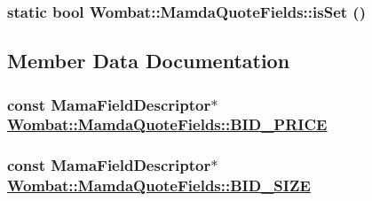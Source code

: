 \hypertarget{classWombat_1_1MamdaQuoteFields_94b81ab8ac496b14f092f0ff3aa2f693}{
\subsubsection[isSet]{\setlength{\rightskip}{0pt plus 5cm}static bool Wombat::Mamda\-Quote\-Fields::is\-Set ()}}
\label{classWombat_1_1MamdaQuoteFields_94b81ab8ac496b14f092f0ff3aa2f693}




\subsection{Member Data Documentation}
\hypertarget{classWombat_1_1MamdaQuoteFields_40dbe59d03aafd4a14e1070fd23f54d3}{
\subsubsection[BID\_\-PRICE]{\setlength{\rightskip}{0pt plus 5cm}const Mama\-Field\-Descriptor$\ast$ \hyperlink{classWombat_1_1MamdaQuoteFields_40dbe59d03aafd4a14e1070fd23f54d3}{Wombat::Mamda\-Quote\-Fields::BID\_\-PRICE}}}
\label{classWombat_1_1MamdaQuoteFields_40dbe59d03aafd4a14e1070fd23f54d3}


\hypertarget{classWombat_1_1MamdaQuoteFields_79b5bca8ad0c5da43814b4bc6f65cde2}{
\subsubsection[BID\_\-SIZE]{\setlength{\rightskip}{0pt plus 5cm}const Mama\-Field\-Descriptor$\ast$ \hyperlink{classWombat_1_1MamdaQuoteFields_79b5bca8ad0c5da43814b4bc6f65cde2}{Wombat::Mamda\-Quote\-Fields::BID\_\-SIZE}}}
\label{classWombat_1_1MamdaQuoteFields_79b5bca8ad0c5da43814b4bc6f65cde2}


